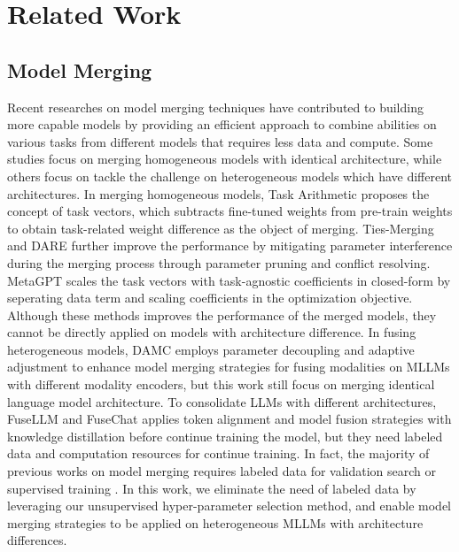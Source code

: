 \section{Related Work}
\label{sec:bk}

\subsection{Model Merging}

Recent researches on model merging techniques have contributed to building more capable models by providing an efficient approach to combine abilities on various tasks from different models that requires less data and compute.
Some studies focus on merging homogeneous models with identical architecture, while others focus on tackle the challenge on heterogeneous models which have different architectures.
In merging homogeneous models, Task Arithmetic \cite{task-arithmetic} proposes the concept of task vectors, which subtracts fine-tuned weights from pre-train weights to obtain task-related weight difference as the object of merging. Ties-Merging \cite{ties} and DARE \cite{dare} further improve the performance by mitigating parameter interference during the merging process through parameter pruning and conflict resolving. MetaGPT \cite{metagpt} scales the task vectors with task-agnostic coefficients in closed-form by seperating data term and scaling coefficients in the optimization objective. Although these methods improves the performance of the merged models, they cannot be directly applied on models with architecture difference.
In fusing heterogeneous models, DAMC \cite{modelcompose} employs parameter decoupling and adaptive adjustment to enhance model merging strategies for fusing modalities on MLLMs with different modality encoders, but this work still focus on merging identical language model architecture. To consolidate LLMs with different architectures, FuseLLM \cite{fusellm} and FuseChat \cite{fusechat} applies token alignment and model fusion strategies with knowledge distillation before continue training the model, but they need labeled data and computation resources for continue training.
In fact, the majority of previous works on model merging requires labeled data for validation search or supervised training \cite{task-arithmetic, ties, dare, modelcompose, fusellm, fusechat}. In this work, we eliminate the need of labeled data by leveraging our unsupervised hyper-parameter selection method, and enable model merging strategies to be applied on heterogeneous MLLMs with architecture differences.

